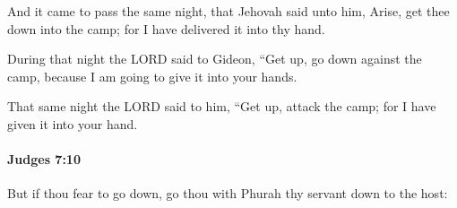 			\begin{versebox}
					\item[BHS] 
					\item[ASV] And it came to pass the same night, that Jehovah said unto him, Arise, get thee down into the camp; for I have delivered it into thy hand.
					\item[NIV] During that night the LORD said to Gideon, “Get up, go down against the camp, because I am going to give it into your hands.
					\item[NRSV] That same night the LORD said to him, “Get up, attack the camp; for I have given it into your hand.
			\end{versebox}

		\paragraph{Judges 7:10} %
			\label{JUDGES-7-10}

			But if thou fear to go down, go thou with Phurah thy servant down to the host:

